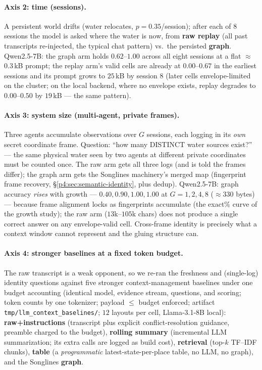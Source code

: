 \documentclass{article}
\begin{document}
\paragraph{Axis 2: time (sessions).}
A persistent world drifts (water relocates, $p{=}0.35$/session); after each of
$8$ sessions the model is asked where the water is now, from \textbf{raw
replay} (all past transcripts re-injected, the typical chat pattern) vs.\ the
persisted \textbf{graph}. Qwen2.5-7B: the graph arm holds $0.62$--$1.00$
across all eight sessions at a flat $\approx$0.3\,kB prompt; the replay arm's
valid cells are already at $0.00$--$0.67$ in the earliest sessions and its
prompt grows to $25$\,kB by session $8$ (later cells envelope-limited on the
cluster; on the local backend, where no envelope exists, replay degrades to
$0.00$--$0.50$ by $19$\,kB --- the same pattern).

\paragraph{Axis 3: system size (multi-agent, private frames).}
Three agents accumulate observations over $G$ sessions, each logging in its
\emph{own} secret coordinate frame. Question: ``how many DISTINCT water sources
exist?'' --- the same physical water seen by two agents at different private
coordinates must be counted once. The raw arm gets all three logs (and is told
the frames differ); the graph arm gets the Songlines machinery's merged map
(fingerprint frame recovery, \S\ref{p4:sec:semantic-identity}, plus dedup).
Qwen2.5-7B: graph accuracy \emph{rises} with growth --- $0.40, 0.90, 1.00,
1.00$ at $G{=}1,2,4,8$ ($\approx$330 bytes) --- because frame alignment locks
as fingerprints accumulate (the exact\% curve of the growth study); the raw arm
($13$k--$105$k chars) does not produce a single correct answer on any
envelope-valid cell. Cross-frame identity is precisely what a context window
cannot represent and the gluing structure can.

\paragraph{Axis 4: stronger baselines at a fixed token budget.}
The raw transcript is a weak opponent, so we re-ran the freshness and
(single-log) identity questions against five stronger context-management
baselines under one budget accounting (identical model, evidence stream,
questions, and scoring; token counts by one tokenizer; payload $\le$ budget
enforced; artifact \texttt{tmp/llm\_context\_baselines/}; $12$ layouts per
cell, Llama-3.1-8B local): \textbf{raw+instructions} (transcript plus explicit
conflict-resolution guidance, preamble charged to the budget),
\textbf{rolling summary} (incremental LLM summarization; its extra calls are
logged as build cost), \textbf{retrieval} (top-$k$ TF--IDF chunks),
\textbf{table} (a \emph{programmatic} latest-state-per-place table, no LLM,
no graph), and the Songlines \textbf{graph}.
\end{document}
